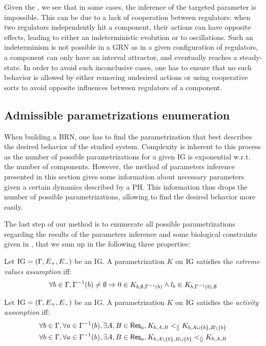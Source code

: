 Given the , we see that in some cases, the inference of the targeted parameter is impossible.
This can be due to a lack of cooperation between regulators: when two regulators independently hit a component, their actions can have opposite effects, leading to either an indeterministic evolution or to oscillations.
Such an indeterminism is not possible in a GRN as in a given configuration of regulators, a component can only have an interval attractor, and eventually reaches a steady-state.
In order to avoid such inconclusive cases, one has to ensure that no such behavior is allowed by either removing undesired actions or using cooperative sorts to avoid opposite influences between regulators of a component.

\subsection{Admissible parametrizations enumeration}\label{ssec:admissible-K}

When building a BRN, one has to find the parametrization that best describes the desired behavior of the studied system.
Complexity is inherent to this process as the number of possible parametrizations for a given IG is exponential w.r.t. the number of components.
However, the method of parameters inference presented in this section gives some information about necessary parameters given a certain dynamics described by a PH.
This information thus drops the number of possible parametrizations, allowing to find the desired behavior more easily.

The last step of our method is to enumerate all possible parametrizations regarding the results of
the parameters inference and some biological constraints given in \cite{BernotSemBRN}, that we sum
up in the following three properties:

\begin{property}
Let $\mathrm{IG} = (\Gamma, E_+, E_-)$ be an IG. A parametrization $K$ on $\mathrm{IG}$ satisfies the \emph{extreme values assumption} iff:
\label{prop:param_enum_extreme}
\[
  \forall b \in \Gamma, \Gamma^{-1}(b) \neq \emptyset \Rightarrow 0 \in K_{b,\emptyset,\Gamma^{-1}(b)} \wedge l_b \in K_{b,\Gamma^{-1}(b),\emptyset}
\]
\end{property}

\begin{property}
\label{prop:param_enum_activity}
Let $\mathrm{IG} = (\Gamma, E_+, E_-)$ be an IG. A parametrization $K$ on $\mathrm{IG}$ satisfies the \emph{activity assumption} iff:
\begin{align*}
  \forall b \in \Gamma, \forall a \in \Gamma^{-1}(b), \exists A,B \in \mathsf{Res}_{a}, K_{b,A,B} <_{[]} K_{b,A \cup \{b\},B \setminus \{b\}}
\\
  \forall b \in \Gamma, \forall a \in \Gamma^{-1}(b), \exists A,B \in \mathsf{Res}_{a}, K_{b,A \setminus \{b\},B \cup \{b\}} <_{[]} K_{b,A,B}
\end{align*}
\end{property}

